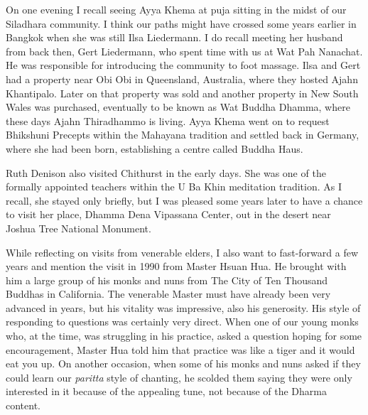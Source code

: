 On one evening I recall seeing Ayya Khema\cite{khema}
at puja sitting in the midst of our Siladhara community. I
think our paths might have crossed some years earlier in Bangkok when
she was still Ilsa Liedermann. I do recall meeting her husband from back
then, Gert Liedermann, who spent time with us at Wat Pah Nanachat. He
was responsible for introducing the community to foot massage. Ilsa and
Gert had a property near Obi Obi in Queensland, Australia, where they
hosted Ajahn Khantipalo. Later on that property was sold and another
property in New South Wales was purchased, eventually to be known as Wat
Buddha Dhamma, where these days Ajahn Thiradhammo is living. Ayya Khema
went on to request Bhikshuni Precepts within the Mahayana tradition and
settled back in Germany, where she had been born, establishing a centre
called Buddha Haus\cite{buddha-haus}.

Ruth Denison\cite{denison}
also visited Chithurst in the early days. She was
one of the formally appointed teachers within the U Ba Khin meditation
tradition. As I recall, she stayed only briefly, but I was pleased some
years later to have a chance to visit her place, Dhamma Dena Vipassana
Center, out in the desert near Joshua Tree National Monument\cite{joshua}.

While reflecting on visits from venerable elders, I also want to
fast-forward a few years and mention the visit in 1990 from Master Hsuan
Hua. He brought with him a large group of his monks and nuns from
The City of Ten Thousand Buddhas\cite{ten-thousand}
in California. The venerable Master must have already
been very advanced in years, but his vitality was impressive, also his
generosity. His style of responding to questions was certainly very direct.
When one of our young monks who, at the time, was struggling in his
practice, asked a question hoping for some encouragement, Master Hua
told him that practice was like a tiger and it would eat you up. On
another occasion, when some of his monks and nuns asked if they could
learn our \emph{paritta} style of chanting, he scolded them saying they
were only interested in it because of the appealing tune, not because of
the Dharma content.


